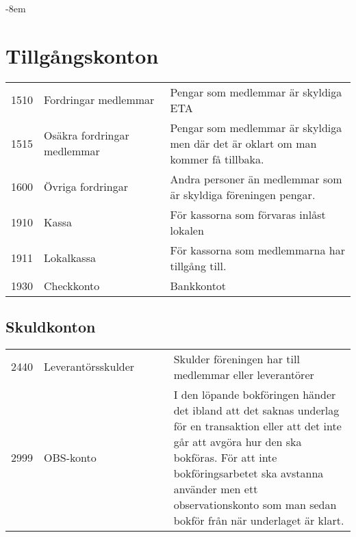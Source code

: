 
		
		\begin{adjustwidth}{}{-8em}
			\section{Tillgångskonton}
			\label{sec:kontoplan:tillgång}
			\begin{xtabular}[l]{l p{0.4\linewidth} p{0.6\linewidth}}
				1510 & Fordringar medlemmar &  Pengar som medlemmar är skyldiga ETA \\
				1515 & Osäkra fordringar medlemmar & Pengar som medlemmar är skyldiga men där det är oklart om man kommer få tillbaka. \\
				1600 & Övriga fordringar & Andra personer än medlemmar som är skyldiga föreningen pengar. \\
				1910 & Kassa & För kassorna som förvaras inlåst lokalen \\
				1911 & Lokalkassa & För kassorna som medlemmarna har tillgång till. \\
				1930 & Checkkonto & Bankkontot \\
				
			\end{xtabular}
		\end{adjustwidth}
		
		\clearpage
		\begin{adjustwidth}{-8em}{}
			\section{Skuldkonton}
			\label{sec:kontoplan:skuld}
			\tablefirsthead{Konto	&	Namn	&	Kommentar	\\\toprule}
			\begin{xtabular}[l]{l p{0.4\linewidth} p{0.6\linewidth}}
				2440 & Leverantörsskulder & Skulder föreningen har till medlemmar eller leverantörer \\
				2999 & OBS-konto & I den löpande bokföringen händer det ibland att det saknas underlag för en transaktion eller att det inte går att avgöra hur den ska bokföras. För att inte bokföringsarbetet ska avstanna använder men ett observationskonto som man sedan bokför från när underlaget är klart. \\
				
			\end{xtabular}
		\end{adjustwidth}
	
